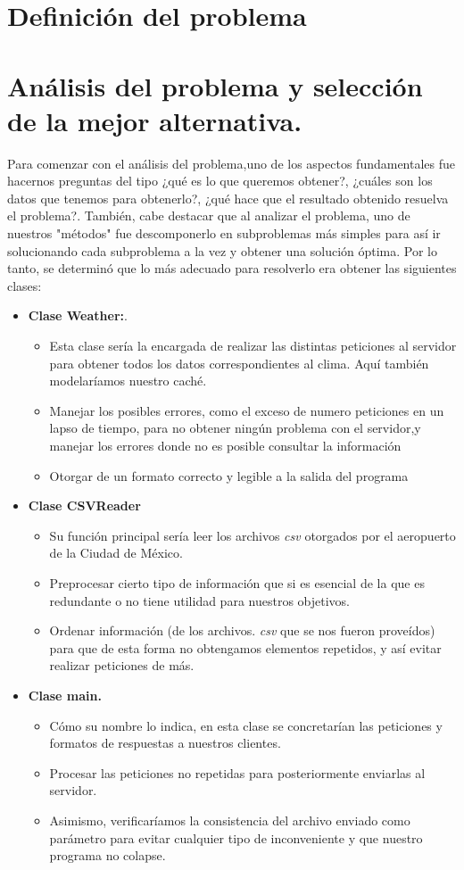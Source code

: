 \documentclass[letterpaper]{article}
\begin{document}
\section{Definición del problema}
\section{Análisis del problema y selección de la mejor alternativa. }
Para comenzar con el análisis del problema,uno de los aspectos fundamentales fue hacernos preguntas del tipo ¿qué es lo que queremos obtener?, ¿cuáles son los datos que tenemos para obtenerlo?, ¿qué hace que el resultado obtenido resuelva el problema?. También, cabe destacar que al analizar el problema, uno de nuestros "métodos" fue descomponerlo en subproblemas más simples para así ir solucionando cada subproblema a la vez y obtener una solución óptima. Por lo tanto, se determinó que lo más adecuado para resolverlo era obtener las siguientes clases:
\begin{itemize}
	\item \textbf{Clase Weather:}.
	\begin{itemize}
		\item Esta clase sería la encargada de realizar las distintas peticiones al servidor para obtener todos los datos correspondientes al clima. Aquí también modelaríamos nuestro caché.
		\item Manejar los posibles errores, como el exceso de numero peticiones en un lapso de tiempo, para no obtener ningún problema con el servidor,y manejar los errores donde no es posible consultar la información
		\item Otorgar de un formato correcto y legible a la salida del programa
	\end{itemize}
	\item \textbf{Clase CSVReader}
	\begin{itemize}
		\item Su función principal sería leer los archivos \textit{csv} otorgados por el aeropuerto de la Ciudad de México.  
		\item Preprocesar cierto tipo de información que si es esencial de la que es redundante o no tiene utilidad para nuestros objetivos.
		\item Ordenar información (de los archivos. \textit{csv} que se nos fueron proveídos) para que de esta forma no obtengamos elementos repetidos, y así evitar realizar peticiones de más.
	\end{itemize}
	\item \textbf{Clase main.}
	\begin{itemize}
		\item Cómo su nombre lo indica, en esta clase se concretarían las peticiones y formatos de respuestas a nuestros clientes.
		\item Procesar las peticiones no repetidas para posteriormente enviarlas al servidor.
		\item Asimismo, verificaríamos la consistencia del archivo enviado como parámetro para evitar cualquier tipo de inconveniente y que nuestro programa no colapse.
	\end{itemize}
\end{itemize}
\end{document}
